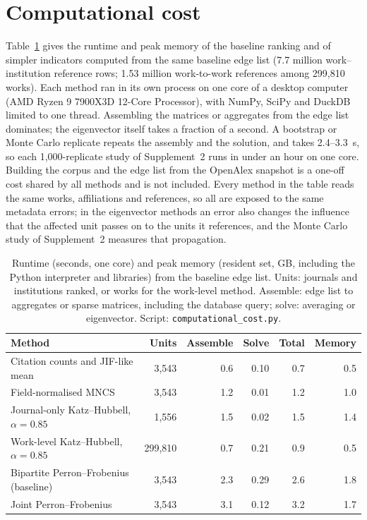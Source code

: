 \section{Computational cost}
\label{sec:cost}

Table~\ref{tab:cost} gives the runtime and peak memory of the baseline ranking and of simpler indicators computed from the same baseline edge list (7.7 million work--institution reference rows; 1.53 million work-to-work references among 299,810 works). Each method ran in its own process on one core of a desktop computer (AMD Ryzen 9 7900X3D 12-Core Processor), with NumPy, SciPy and DuckDB limited to one thread. Assembling the matrices or aggregates from the edge list dominates; the eigenvector itself takes a fraction of a second. A bootstrap or Monte Carlo replicate repeats the assembly and the solution, and takes 2.4--3.3~s, so each 1,000-replicate study of Supplement~2 runs in under an hour on one core. Building the corpus and the edge list from the OpenAlex snapshot is a one-off cost shared by all methods and is not included. Every method in the table reads the same works, affiliations and references, so all are exposed to the same metadata errors; in the eigenvector methods an error also changes the influence that the affected unit passes on to the units it references, and the Monte Carlo study of Supplement~2 measures that propagation.

\begin{table}[!htbp]
  \centering
  \small
  \caption{Runtime (seconds, one core) and peak memory (resident set, GB, including the Python interpreter and libraries) from the baseline edge list. Units: journals and institutions ranked, or works for the work-level method. Assemble: edge list to aggregates or sparse matrices, including the database query; solve: averaging or eigenvector. Script: \texttt{computational\_cost.py}.}
  \label{tab:cost}
  \begin{tabular}{@{}lrrrrr@{}}
    \toprule
    Method & Units & Assemble & Solve & Total & Memory \\
    \midrule
    Citation counts and JIF-like mean & 3,543 & 0.6 & 0.10 & 0.7 & 0.5 \\
    Field-normalised MNCS & 3,543 & 1.2 & 0.01 & 1.2 & 1.0 \\
    Journal-only Katz--Hubbell, $\alpha=0.85$ & 1,556 & 1.5 & 0.02 & 1.5 & 1.4 \\
    Work-level Katz--Hubbell, $\alpha=0.85$ & 299,810 & 0.7 & 0.21 & 0.9 & 0.5 \\
    Bipartite Perron--Frobenius (baseline) & 3,543 & 2.3 & 0.29 & 2.6 & 1.8 \\
    Joint Perron--Frobenius & 3,543 & 3.1 & 0.12 & 3.2 & 1.7 \\
    \bottomrule
  \end{tabular}
\end{table}

